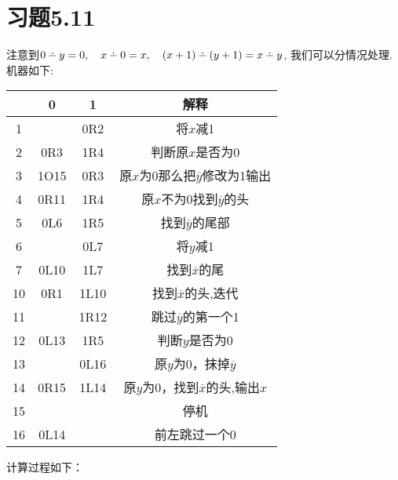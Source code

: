\documentclass{article}
\def\dotminus{\mathbin{\ooalign{\hss\raise1ex\hbox{.}\hss\cr
  \mathsurround=0pt$-$}}}
\begin{document}
\section*{习题5.11}
注意到$0\dotminus y = 0,\quad x \dotminus 0 = x, \quad (x+1)\dotminus(y+1) = x \dotminus y$, 我们可以分情况处理.
机器如下:
\begin{center}
\begin{tabular}{|c|c|c|c|}
	\hline
	&0&1&解释\\
	\hline
	1&&0R2&将$x$减1\\
	2&0R3&1R4&判断原$x$是否为0\\
	3&1O15&0R3&原$x$为0那么把$\overline y$修改为1输出\\
	4&0R11&1R4&原$x$不为0找到$\overline y$的头\\
	5&0L6&1R5&找到$\overline y$的尾部\\
	6&&0L7&将$y$减1\\
	7&0L10&1L7&找到$\overline x$的尾\\
	10&0R1&1L10&找到$\overline x$的头,迭代\\	
	11&&1R12&跳过$\overline y$的第一个1\\
	12&0L13&1R5&判断$y$是否为0\\
	13&&0L16&原$y$为0，抹掉$\overline y$\\
	14&0R15&1L14&原$y$为0，找到$\overline x$的头,输出$x$\\
	15&&&停机\\
	16&0L14&&前左跳过一个0\\
	\hline
\end{tabular}
\end{center}
计算过程如下：
\end{document}
